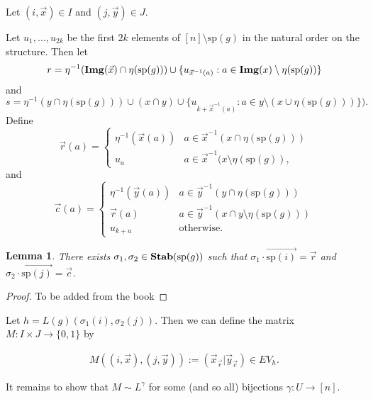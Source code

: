 \documentclass[12pt]{report}
\newtheorem{lem}[thm]{Lemma} \newtheorem{prop}[thm]{Proposition}
\newcommand{\stab}{\text{\textbf{Stab}}}
\newcommand{\img}{\text{\textbf{Img}}}
\newcommand{\consp}{\text{sp}}
\newcommand{\spstab}[1]{\stab (\consp (#1))}
\begin{document}
Let $(i, \vec{x}) \in I$ and $(j, \vec{y}) \in J$.

Let $u_1 , \ldots , u_{2k}$ be the first $2k$ elements of $[n] \setminus
\consp(g)$ in the natural order on the structure. Then let
\[r = \eta^{-1} (\img(\vec{x}) \cap \eta (\consp(g))) \cup
  \{u_{\vec{x}^{-1}(a)}: a \in \img(x) \setminus \eta (\consp (g))\} \] and
\[s = \eta^{-1} (y \cap \eta (\consp(g))) \cup (x \cap y) \cup \{ u_{k +
    \vec{x}^{-1}(a)} : a \in y \setminus (x \cup \eta (\consp (g))) \}). \]
Define
\[
  \vec{r} (a) =
  \begin{cases}
    \eta^{-1} (\vec{x} (a)) & a \in \vec{x}^{-1} (x \cap \eta (\consp(g))) \\
    u_{a} & a \in \vec{x}^{-1} (x \setminus \eta(\consp(g)),
  \end{cases}
\]
and
\[
  \vec{c} (a) =
  \begin{cases}
    \eta^{-1} (\vec{y} (a)) & a \in \vec{y}^{-1}(y \cap \eta (\consp (g))) \\
    \vec{r} (a) & a \in \vec{y}^{-1} (x \cap y \setminus \eta (\consp (g))) \\
    u_{k+a} & \text{otherwise}.
  \end{cases}
\]

\begin{lem}
  \label{lem:permutation_row-column}
  There exists $\sigma_1, \sigma_2 \in \spstab{g}$ such that $\sigma_1 \cdot
  \vec{\consp(i)} = \vec{r}$ and $\sigma_2 \cdot \vec{\consp(j)} = \vec{c}$.
\end{lem}
\begin{proof}
  To be added from the book
\end{proof}

Let $h = L(g)(\sigma_1(i), \sigma_2 (j))$. Then we can define the matrix $M : I
\times J \rightarrow \{0,1\}$ by

\begin{align*}
  M((i , \vec{x}), (j, \vec{y})) := (\vec{x}_{\vec{r}} \vert \vec{y}_{\vec{c}}) \in EV_h.
\end{align*}

It remains to show that $M \sim L^{\gamma}$ for some (and so all) bijections
$\gamma: U \rightarrow [n]$.
\end{document}
